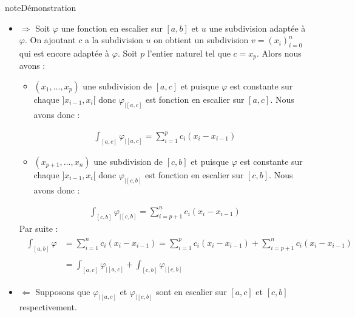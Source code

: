 \documentclass[letterpaper,10pt,french]{sphinxmanual}
\begin{document}
\begin{sphinxadmonition}{note}{Démonstration}
\begin{itemize}
\item {} 
\sphinxAtStartPar
\(\Rightarrow\)
Soit \(\varphi\) une fonction en escalier sur \([a, b]\) et \(u\) une subdivision adaptée à \(\varphi\). On ajoutant \(c\) a la subdivision \(u\) on obtient un subdivision \(v=(x_i)_{i=0}^n\) qui est encore adaptée à \(\varphi\). Soit \(p\) l’entier naturel tel que \(c=x_p\). Alors nous avons :
\begin{itemize}
\item {} 
\sphinxAtStartPar
\((x_1, \ldots, x_p)\) une subdivision de  \([a, c]\) et puisque \(\varphi\) est constante sur chaque \(]x_{i-1}, x_{i}[\) donc \(\varphi_{|[a, c]}\) est fonction en escalier sur \([a, c]\). Nous avons donc :

\end{itemize}
\begin{equation*}
\begin{split}
    \int_{[a, c]}\varphi_{|[a, c]} = \sum_{i=1}^{p} c_i(x_i-x_{i-1})
    \end{split}
\end{equation*}\begin{itemize}
\item {} 
\sphinxAtStartPar
\((x_{p+1}, \ldots, x_n)\) une subdivision de  \([c, b]\) et puisque \(\varphi\) est constante sur chaque \(]x_{i-1}, x_{i}[\) donc \(\varphi_{|[c, b]}\) est fonction en escalier sur \([c, b]\). Nous avons donc :

\end{itemize}
\begin{equation*}
\begin{split}
    \int_{[c, b]}\varphi_{|[c, b]} = \sum_{i=p+1}^{n} c_i(x_i-x_{i-1})
    \end{split}
\end{equation*}
\sphinxAtStartPar
Par suite :
\begin{equation*}
\begin{split}
    \begin{aligned}
    \int_{[a, b]}\varphi &= \sum_{i=1}^{n} c_i(x_i-x_{i-1})=\sum_{i=1}^{p} c_i(x_i-x_{i-1}) + \sum_{i=p+1}^{n} c_i(x_i-x_{i-1}) \\ \\ 
     &= \int_{[a, c]}\varphi_{|[a, c]} + \int_{[c, b]}\varphi_{|[c, b]}
    \end{aligned}
    \end{split}
\end{equation*}
\end{itemize}
\begin{itemize}
\item {} 
\sphinxAtStartPar
\(\Leftarrow\)
Supposons que \(\varphi_{|[a, c]}\) et \(\varphi_{|[c, b]}\) sont en escalier sur \([a, c]\) et \([c, b]\) respectivement.


\end{itemize}
\end{sphinxadmonition}
\end{document}
